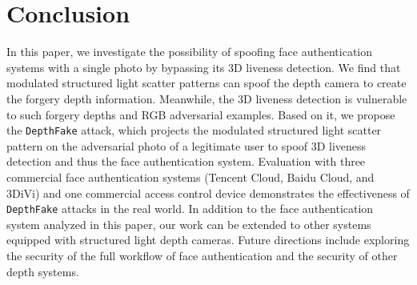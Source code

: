 \section{Conclusion}

In this paper, we investigate the possibility of spoofing  face authentication systems with a single photo by bypassing its 3D liveness detection. 
We find that modulated structured light scatter patterns can spoof the depth camera to create the forgery depth information. Meanwhile, the 3D liveness detection is vulnerable to such forgery depths and RGB adversarial examples. 
Based on it, we propose the \texttt{DepthFake} attack, which projects the modulated structured light scatter pattern on the adversarial photo of a legitimate user to spoof 3D liveness detection and thus the face authentication system.
Evaluation with three commercial face authentication systems (Tencent Cloud, Baidu Cloud, and 3DiVi) and one commercial access control device demonstrates the effectiveness of \texttt{DepthFake}  attacks in the real world. In addition to the face authentication system analyzed in this paper, our work can be extended to other systems equipped with structured light depth cameras. Future directions include exploring the security of the full workflow of face authentication and the security of other depth systems.